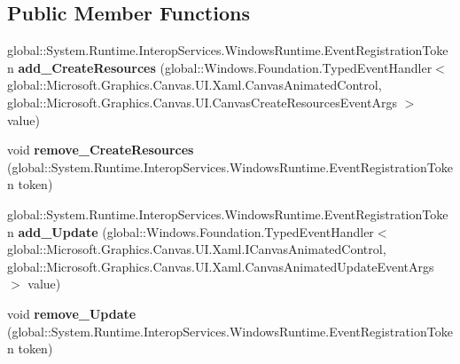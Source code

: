 \subsection*{Public Member Functions}
\begin{DoxyCompactItemize}
\item 
\mbox{\label{interface_microsoft_1_1_graphics_1_1_canvas_1_1_u_i_1_1_xaml_1_1_i_canvas_animated_control_af05296a1a18229faaeee054fa63665aa}} 
global\+::\+System.\+Runtime.\+Interop\+Services.\+Windows\+Runtime.\+Event\+Registration\+Token {\bfseries add\+\_\+\+Create\+Resources} (global\+::\+Windows.\+Foundation.\+Typed\+Event\+Handler$<$ global\+::\+Microsoft.\+Graphics.\+Canvas.\+U\+I.\+Xaml.\+Canvas\+Animated\+Control, global\+::\+Microsoft.\+Graphics.\+Canvas.\+U\+I.\+Canvas\+Create\+Resources\+Event\+Args $>$ value)
\item 
\mbox{\label{interface_microsoft_1_1_graphics_1_1_canvas_1_1_u_i_1_1_xaml_1_1_i_canvas_animated_control_a4911c1a0849c77431433f7738b46dda9}} 
void {\bfseries remove\+\_\+\+Create\+Resources} (global\+::\+System.\+Runtime.\+Interop\+Services.\+Windows\+Runtime.\+Event\+Registration\+Token token)
\item 
\mbox{\label{interface_microsoft_1_1_graphics_1_1_canvas_1_1_u_i_1_1_xaml_1_1_i_canvas_animated_control_aee65ebdd3be32b82bf4a1554f8c2b8c6}} 
global\+::\+System.\+Runtime.\+Interop\+Services.\+Windows\+Runtime.\+Event\+Registration\+Token {\bfseries add\+\_\+\+Update} (global\+::\+Windows.\+Foundation.\+Typed\+Event\+Handler$<$ global\+::\+Microsoft.\+Graphics.\+Canvas.\+U\+I.\+Xaml.\+I\+Canvas\+Animated\+Control, global\+::\+Microsoft.\+Graphics.\+Canvas.\+U\+I.\+Xaml.\+Canvas\+Animated\+Update\+Event\+Args $>$ value)
\item 
\mbox{\label{interface_microsoft_1_1_graphics_1_1_canvas_1_1_u_i_1_1_xaml_1_1_i_canvas_animated_control_aab80ec4a2429b892a73b2956101de68e}} 
void {\bfseries remove\+\_\+\+Update} (global\+::\+System.\+Runtime.\+Interop\+Services.\+Windows\+Runtime.\+Event\+Registration\+Token token)

\end{DoxyCompactItemize}
